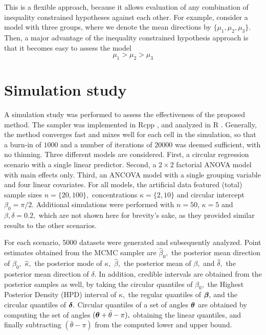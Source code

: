 This is a flexible approach, because it allows evaluation of any combination of inequality constrained hypotheses against each other. For example, consider a model with three groups, where we denote the mean directions by \( \{ \mu_1, \mu_2, \mu_3 \} \). Then, a major advantage of the inequality constrained hypothesis approach is that it becomes easy to assess the model
\begin{equation}
\mu_1 > \mu_2 > \mu_3
\end{equation}

\section{Simulation study}

\label{sim}

A simulation study was performed to assess the effectiveness of the proposed method. The sampler was implemented in Rcpp \citep{rcpp}, and analyzed in R \citep{r2016}.  Generally, the method converges fast and mixes well for each cell in the simulation, so that a burn-in of \(1000\) and a number of iterations of \( 20000 \) was deemed sufficient, with no thinning.
Three different models are considered. First, a circular regression scenario with a single linear predictor. Second, a \( 2 \times 2 \) factorial ANOVA model with main effects only. Third, an ANCOVA model with a single grouping variable and four linear covariates.  For all models, the artificial data featured (total) sample sizes \( n = \{ 20, 100 \},\) concentrations \( \kappa = \{ 2, 10 \}\) and circular intercept \( \beta_0 = \pi/2.\) Additional simulations were performed with \( n = 50 \), \( \kappa = 5 \) and \( \beta, \delta = 0.2,\) which are not shown here for brevity's sake, as they provided similar results to the other scenarios.

For each scenario, 5000 datasets were generated and subsequently analyzed. Point estimates obtained from the MCMC sampler are \( \hat{\beta}_0,\) the posterior mean direction of \(\beta_0, \) \( \hat{\kappa},\) the posterior mode of \( \kappa,\) \( \hat{\beta},\) the posterior mean of \( \beta,\) and \( \hat{\delta},\) the posterior mean direction of \( \delta.\) In addition, credible intervals are obtained from the posterior samples as well, by taking the circular quantiles of \(\beta_0, \) the Highest Posterior Density (HPD) interval of \( \kappa,\) the regular quantiles of \( \boldsymbol{\beta},\) and the circular quantiles of \( \boldsymbol{\delta}.\) Circular quantiles of a set of angles \( \boldsymbol{\theta} \) are obtained by computing the set of angles \( (\boldsymbol{\theta} + \bar\theta - \pi),\) obtaining the linear quantiles, and finally subtracting \( (\bar\theta - \pi) \) from the computed lower and upper bound.

